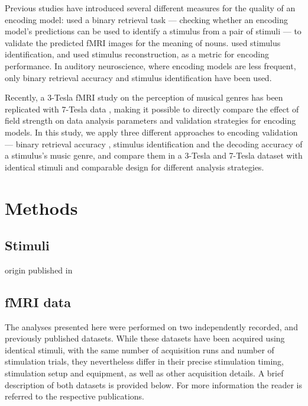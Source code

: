Previous studies have introduced several different measures for the quality of an
encoding model: \citet{ML08} used a binary retrieval task --- checking whether an encoding model's predictions
can be used to identify a stimulus from a pair of stimuli ---
to validate the predicted f{MRI} images for the meaning of nouns. \citet{KG+08} used stimulus
identification, and \citet{NG09} used stimulus reconstruction,
as a metric for encoding performance. In auditory neuroscience, where encoding models are less
frequent, only binary retrieval accuracy \citep{CTK+2012} and stimulus
identification \citep{SF14} have been used.

Recently, a 3-Tesla f{MRI} study on the perception of
musical genres \citep{CTK+2012} has been replicated with 7-Tesla data
\citep{HDH+2015}, making it possible to directly compare the effect of field
strength on data analysis parameters and validation strategies for encoding models. In this study,
we apply three different approaches to encoding validation --- binary retrieval accuracy \citep{ML08},
stimulus identification \citep{KG+08,SF14} and the decoding accuracy of a
stimulus's music genre, and compare them in a 3-Tesla and 7-Tesla dataset with
identical stimuli and comparable design for different analysis strategies.


\section*{Methods}

\subsection*{Stimuli}

origin \citet{CTK+2012}
published in \citet{HDH+2015}

\subsection*{fMRI data}

The analyses presented here were performed on two independently recorded,
and previously published datasets. While these datasets have been acquired
using identical stimuli, with the same number of acquisition runs and
number of stimulation trials, they nevertheless differ in their precise
stimulation timing, stimulation setup and equipment, as well as other
acquisition details. A brief description of both datasets is provided below.
For more information the reader is referred to the respective publications.

